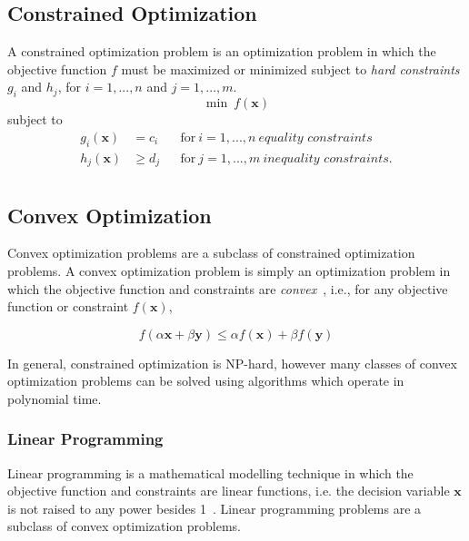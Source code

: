 \documentclass[../mthe-493-final-project.tex]{subfiles}
\begin{document}
    
    \subsection{Constrained Optimization}
    \label{ssec:constrained-optimization}

    A constrained optimization problem is an optimization problem in which the objective function $f$ must be maximized or minimized subject to \textit{hard constraints} $g_i$ and $h_j$, for $i=1,...,n$ and $j=1,...,m$.
    \[ \min \ f(\mathbf{x}) \]
    subject to
    \begin{align*}
        g_i(\mathbf{x}) &= c_i    & &\text{for} \ i = 1,...,n \ \textit{equality constraints}    \\
        h_j(\mathbf{x}) &\geq d_j & &\text{for} \ j = 1,...,m \ \textit{inequality constraints}. \\
    \end{align*}

    \subsection{Convex Optimization}
    \label{ssec:convex-optimization}
    
    Convex optimization problems are a subclass of constrained optimization problems. A convex optimization problem is simply an optimization problem in which the objective function and constraints are \textit{convex}~\cite{boyd_vandenberghe_2009}, i.e., for any objective function or constraint $f(\mathbf{x})$, 
        
        \[ f(\alpha \mathbf{x} + \beta \mathbf{y}) \leq \alpha f(\mathbf{x}) + \beta f(\mathbf{y}) \]
        
    In general, constrained optimization is NP-hard, however many classes of convex optimization problems can be solved using algorithms which operate in polynomial time.
    
    \subsubsection{Linear Programming}
    \label{sssec:linear-programming}
    
    Linear programming is a mathematical modelling technique in which the objective function and constraints are linear functions, i.e. the decision variable $\mathbf{x}$ is not raised to any power besides 1~\cite{the_editors_of_encyclopaedia_britannica_2017}. Linear programming problems are a subclass of convex optimization problems.
    
\end{document}
